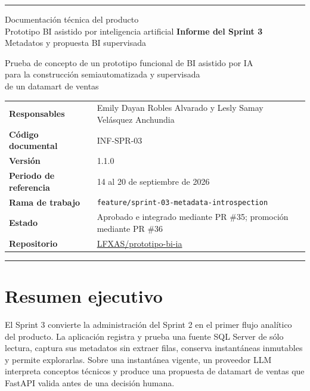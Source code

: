 \documentclass[11pt,letterpaper]{article}
\newcommand{\file}[1]{\texttt{#1}}
\begin{document}
\hypersetup{pageanchor=false}
\begin{titlepage}
  \thispagestyle{empty}
  \vspace*{0.8cm}
  {\color{ugblue}\rule{\textwidth}{2.8pt}}
  \vspace{1.2cm}
  {\Large Documentación técnica del producto\\[0.25em]
  Prototipo BI asistido por inteligencia artificial}
  \vfill
  {\color{deepgreen}\fontsize{28}{34}\selectfont\textbf{Informe del Sprint 3}}\\[0.7em]
  {\LARGE Metadatos y propuesta BI supervisada}\\[0.6em]
  {\large Prueba de concepto de un prototipo funcional de BI asistido por IA\\
  para la construcción semiautomatizada y supervisada\\
  de un datamart de ventas\par}
  \vspace{1.4cm}
  \begin{tabularx}{\textwidth}{@{}>{\bfseries}l X@{}}
    Responsables & Emily Dayan Robles Alvarado y Lesly Samay Velásquez Anchundia \\
    Código documental & INF-SPR-03 \\
    Versión & 1.1.0 \\
    Periodo de referencia & 14 al 20 de septiembre de 2026 \\
    Rama de trabajo & \file{feature/sprint-03-metadata-introspection} \\
    Estado & Aprobado e integrado mediante PR \#35; promoción mediante PR \#36 \\
    Repositorio & \href{https://github.com/LFXAS/prototipo-bi-ia}{LFXAS/prototipo-bi-ia} \\
  \end{tabularx}
  \vfill
  {\color{ugblue}\rule{\textwidth}{2.8pt}}
\end{titlepage}
\hypersetup{pageanchor=true}
\tableofcontents
\newpage
{}

\section{Resumen ejecutivo}

El Sprint 3 convierte la administración del Sprint 2 en el primer flujo analítico del producto. La aplicación registra y prueba una fuente SQL Server de sólo lectura, captura sus metadatos sin extraer filas, conserva instantáneas inmutables y permite explorarlas. Sobre una instantánea vigente, un proveedor LLM interpreta conceptos técnicos y produce una propuesta de datamart de ventas que FastAPI valida antes de una decisión humana.
\end{document}
